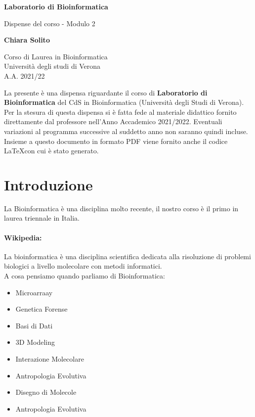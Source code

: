 \documentclass{article}
\begin{document}
\newcommand\tab[1][0.3cm]{\hspace*{#1}}


\begin{titlepage}
    \begin{center}
        \vspace*{1cm}
            
        \Huge
        \textbf{Laboratorio di Bioinformatica}
            
        \vspace{0.5cm}
        \LARGE
        Dispense del corso - Modulo 2
            
        \vspace{1.5cm}
            
        \textbf{Chiara Solito}

        \vspace{0.8cm}

            
        \Large
        Corso di Laurea in Bioinformatica\\
        Università degli studi di Verona\\
        A.A. 2021/22
            
    \end{center}
\end{titlepage}
La presente è una dispensa riguardante il corso di \textbf{Laboratorio di Bioinformatica} del CdS in Bioinformatica (Università degli Studi di Verona). Per la stesura di questa dispensa si è fatta fede al materiale didattico fornito direttamente dal professore nell'Anno Accademico 2021/2022. Eventuali variazioni al programma successive al suddetto anno non saranno quindi incluse.\\
Insieme a questo documento in formato PDF viene fornito anche il codice \LaTeX  con cui è stato generato.
\tableofcontents
\thispagestyle{empty}
\newpage
\thispagestyle{empty}

\section{Introduzione}
La Bioinformatica è una disciplina molto recente, il nostro corso è il primo in laurea triennale in Italia.
\paragraph{Wikipedia:} La bioinformatica è una disciplina scientifica dedicata alla risoluzione
di problemi biologici a livello molecolare con metodi informatici.\\
A cosa pensiamo quando parliamo di Bioinformatica:
\begin{itemize}
    \item Microarraay
    \item Genetica Forense 
    \item Basi di Dati
    \item 3D Modeling
    \item Interazione Molecolare 
    \item Antropologia Evolutiva
    \item Disegno di Molecole 
    \item Antropologia Evolutiva 
\end{itemize}
\end{document}
